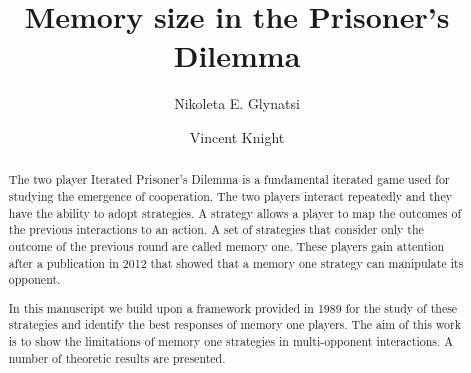 \documentclass[10pt]{article}
\title{Memory size in the Prisoner's Dilemma}
\author{Nikoleta E. Glynatsi \and Vincent Knight}
\date{}
\begin{document}
\maketitle

\begin{abstract}

The two player Iterated Prisoner's Dilemma is a fundamental iterated game used
for studying the emergence of cooperation. The two players interact repeatedly
and they have the ability to adopt strategies. A strategy allows a player to map
the outcomes of the previous interactions to an action. A set of strategies that
consider only the outcome of the previous round are called memory one. These
players gain attention after a publication in 2012 that showed that a memory one
strategy can manipulate its opponent.

In this manuscript we build upon a framework provided in 1989 for the study of
these strategies and identify the best responses of memory one players. The aim
of this work is to show the limitations of memory one strategies in multi-opponent
interactions. A number of theoretic results are presented.
\end{abstract}



\end{document}
